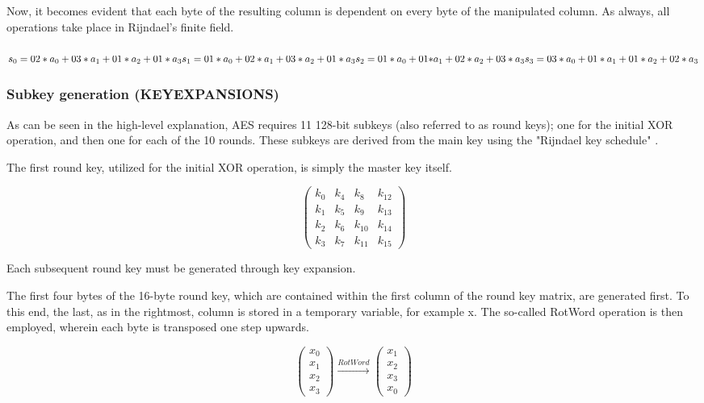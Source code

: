 \documentclass[12pt]{report}
\begin{document}
Now, it becomes evident that each byte of the resulting column is dependent on every byte of the manipulated column. As always, all operations take place in Rijndael's finite field. \\
\\
$
s_0 = {02}*a_0+{03}*a_1+{01}*a_2+{01}*a_3 \\
s_1 = {01}*a_0+{02}*a_1+{03}*a_2+{01}*a_3 \\
s_2 = {01}*a_0+{01*}a_1+{02}*a_2+{03}*a_3 \\
s_3 = {03}*a_0+{01}*a_1+{01}*a_2+{02}*a_3 \\ $

\subsubsection{Subkey generation (KEYEXPANSIONS)}
As can be seen in the high-level explanation, AES requires 11 128-bit subkeys (also referred to as round keys); one for the initial XOR operation, and then one for each of the 10 rounds. These subkeys are derived from the main key using the "Rijndael key schedule" \cite{KeySchedule}.


The first round key, utilized for the initial XOR operation, is simply the master key itself.

\[ \left( \begin{array}{cccc}
k_0 & k_4 & k_8 & k_{12} \\
k_1 & k_5 & k_9 & k_{13} \\
k_2 & k_6 & k_{10} & k_{14} \\
k_3 & k_7 & k_{11} & k_{15}\end{array} \right)\] 

Each subsequent round key must be generated through key expansion.

The first four bytes of the 16-byte round key, which are contained within the first column of the round key matrix, are generated first. To this end, the last, as in the rightmost, column is stored in a temporary variable, for example x. The so-called RotWord operation is then employed, wherein each byte is transposed one step upwards.

\[
\left( \begin{array}{c}
x_0 \\
x_1 \\
x_2 \\
x_3\end{array} \right)
\xrightarrow{RotWord}
\left( \begin{array}{c}
x_1 \\
x_2 \\
x_3 \\
x_0\end{array} \right)
\]
\end{document}
